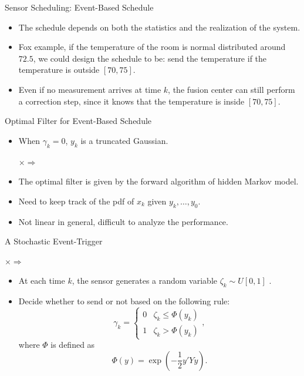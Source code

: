 \documentclass[10pt]{beamer}
\newlength\figureheight
\newlength\figurewidth
\newcommand{\tikzdir}[1]{#1.tikz}
\newcommand{\inputtikz}[1]{}}
\DeclareMathOperator{\1}{\textbf{1}}
\begin{document}
  \begin{frame}{Sensor Scheduling: Event-Based Schedule}
    \begin{itemize}
      \item The schedule depends on both the statistics and the realization of the system. 
      \item Fox example, if the temperature of the room is normal distributed around $72.5$, we could design the schedule to be: send the temperature if the temperature is outside $[70,75]$.
      \item Even if no measurement arrives at time $k$, the fusion center can still perform a correction step, since it knows that the temperature is inside $[70,75]$.
    \end{itemize}
  \end{frame}

  \begin{frame}{Optimal Filter for Event-Based Schedule}

    \begin{itemize}
      \item When $\gamma_k = 0$, $y_k$ is a truncated Gaussian.
	\setlength\figureheight{2cm}
	\setlength\figurewidth{3cm}
	\begin{center}
	  \inputtikz{gaussian}$\times$\inputtikz{det}$\Rightarrow$\inputtikz{det2}
	\end{center}
      \item The optimal filter is given by the forward algorithm of hidden Markov model.
      \item Need to keep track of the pdf of $x_k$ given $y_k,\dots,y_0$.
      \item Not linear in general, difficult to analyze the performance.
    \end{itemize}
  \end{frame}

  \begin{frame}{A Stochastic Event-Trigger}
	\setlength\figureheight{2cm}
	\setlength\figurewidth{3cm}
	\begin{center}
	  \inputtikz{gaussian}$\times$\inputtikz{rand}$\Rightarrow$\inputtikz{rand2}
	\end{center}
      \begin{itemize}
	\item At each time $k$, the sensor generates a random variable $\zeta_k\sim U[0,1]$ .
	\item Decide whether to send or not based on the following rule:
	  \begin{displaymath}
	      \gamma_k= \begin{cases}
		0&\zeta_k \leq \Phi(y_k)\\
		1&\zeta_k > \Phi(y_k)
	    \end{cases},
	  \end{displaymath}
	  where $\Phi$ is defined as
	  \begin{displaymath}
	    \Phi(y) = \exp\left( -\frac{1}{2}y'Yy \right). 
	  \end{displaymath}
      \end{itemize}
  \end{frame}
\end{document}
